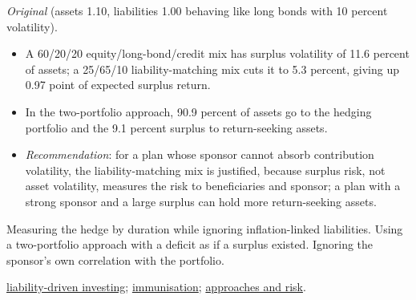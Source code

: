 \begin{qfmethod}
 \emph{Original} (assets 1.10, liabilities 1.00 behaving like long bonds with 10 percent volatility).
\begin{itemize}
\item A 60/20/20 equity/long-bond/credit mix has surplus volatility of 11.6 percent of assets; a 25/65/10 liability-matching mix cuts it to 5.3 percent, giving up 0.97 point of expected surplus return.
\item In the two-portfolio approach, 90.9 percent of assets go to the hedging portfolio and the 9.1 percent surplus to return-seeking assets.
\item \emph{Recommendation}: for a plan whose sponsor cannot absorb contribution volatility, the liability-matching mix is justified, because surplus risk, not asset volatility, measures the risk to beneficiaries and sponsor; a plan with a strong sponsor and a large surplus can hold more return-seeking assets.
\end{itemize}

 Measuring the hedge by duration while ignoring inflation-linked liabilities. Using a two-portfolio approach with a deficit as if a surplus existed. Ignoring the sponsor's own correlation with the portfolio.

 \hyperref[meth:liability-matching-ladders]{liability-driven investing}; \hyperref[meth:immunisation-liabilities]{immunisation}; \hyperref[def:allocation-approaches-risk]{approaches and risk}.

\end{qfmethod}

